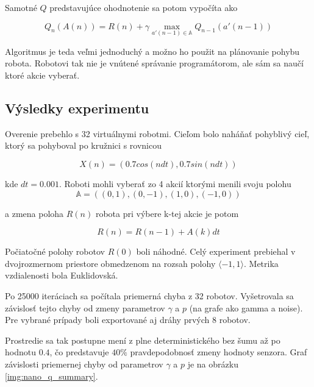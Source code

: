 Samotné $Q$ predstavujúce ohodnotenie sa potom vypočíta ako

\begin{equation}
Q_n(A(n)) = R(n) + \gamma  \max_{a'(n-1) \in \mathbb{A}} Q_{n-1}(a'(n-1))
\label{eq:nano_q_func}
\end{equation}

Algoritmus je teda veľmi jednoduchý a možno ho použit na plánovanie pohybu robota.
Robotovi tak nie je vnútené správanie programátorom, ale sám sa naučí ktoré akcie
vyberať.


\subsection{Výsledky experimentu}

Overenie prebehlo s 32 virtuálnymi robotmi. Cieľom bolo naháňať pohyblivý cieľ,
ktorý sa pohyboval po kružnici s rovnicou

\begin{equation}
  X(n) = (0.7cos(ndt), 0.7sin(ndt))
\label{eq:q_nano_target}
\end{equation}

kde $dt = 0.001$. Roboti mohli vyberať zo 4 akcií ktorými menili svoju polohu
\begin{equation}
\mathbb{A} = ( (0, 1), (0, -1), (1, 0), (-1, 0))
\end{equation}

a zmena poloha $R(n)$ robota pri výbere k-tej akcie je potom

\begin{equation}
  R(n) = R(n-1) + A(k)dt
\label{eq:q_nano_move}
\end{equation}

Počiatočné polohy robotov $R(0)$ boli náhodné.
Celý experiment prebiehal v dvojrozmernom priestore obmedzenom na rozsah
polohy $\langle -1, 1 \rangle$. Metrika vzdialenosti bola Euklidovská.

Po 25000 iteráciach sa počítala priemerná chyba z 32 robotov. Vyšetrovala
sa závislosť tejto chyby od zmeny parametrov $\gamma$ a $p$ (na grafe ako gamma a noise).
Pre vybrané prípady boli exportované aj dráhy prvých 8 robotov.

Prostredie sa tak postupne mení z plne deterministického bez šumu až po hodnotu $0.4$,
čo predstavuje $40\%$ pravdepodobnosť zmeny hodnoty senzora. Graf závislosti priemernej chyby
od parametrov $\gamma$ a $p$ je na obrázku \ref{img:nano_q_summary}.

